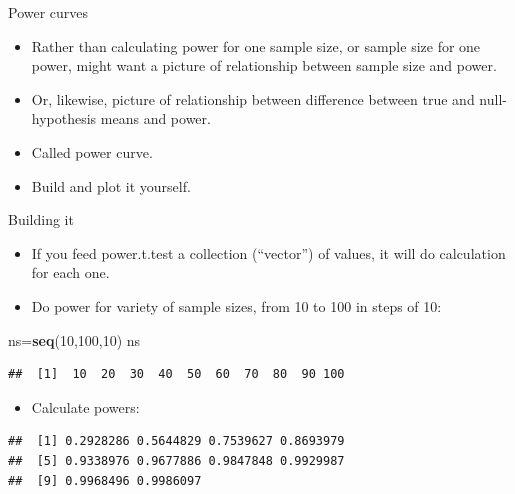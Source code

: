 \documentclass[ignorenonframetext,]{beamer}
\newenvironment{Shaded}{\begin{snugshade}}{\end{snugshade}}
\newcommand{\DataTypeTok}[1]{\textcolor[rgb]{0.13,0.29,0.53}{#1}}
\newcommand{\DecValTok}[1]{\textcolor[rgb]{0.00,0.00,0.81}{#1}}
\newcommand{\KeywordTok}[1]{\textcolor[rgb]{0.13,0.29,0.53}{\textbf{#1}}}
\newcommand{\NormalTok}[1]{#1}
\newcommand{\OperatorTok}[1]{\textcolor[rgb]{0.81,0.36,0.00}{\textbf{#1}}}
\newcommand{\StringTok}[1]{\textcolor[rgb]{0.31,0.60,0.02}{#1}}
\providecommand{\tightlist}{%
  \setlength{\itemsep}{0pt}\setlength{\parskip}{0pt}}
\begin{document}
\begin{frame}{Power curves}
\protect\hypertarget{power-curves}{}

\begin{itemize}
\tightlist
\item
  Rather than calculating power for one sample size, or sample size for
  one power, might want a picture of relationship between sample size
  and power.
\item
  Or, likewise, picture of relationship between difference between true
  and null-hypothesis means and power.
\item
  Called power curve.
\item
  Build and plot it yourself.
\end{itemize}

\end{frame}

\begin{frame}[fragile]{Building it}
\protect\hypertarget{building-it}{}

\begin{itemize}
\tightlist
\item
  If you feed power.t.test a collection (``vector'') of values, it will
  do calculation for each one.
\item
  Do power for variety of sample sizes, from 10 to 100 in steps of 10:
\end{itemize}

\begin{Shaded}
\begin{Highlighting}[]
\NormalTok{ns=}\KeywordTok{seq}\NormalTok{(}\DecValTok{10}\NormalTok{,}\DecValTok{100}\NormalTok{,}\DecValTok{10}\NormalTok{)}
\NormalTok{ns}
\end{Highlighting}
\end{Shaded}

\begin{verbatim}
##  [1]  10  20  30  40  50  60  70  80  90 100
\end{verbatim}

\begin{itemize}
\tightlist
\item
  Calculate powers:
\end{itemize}

\begin{Shaded}
\end{Shaded}

\begin{verbatim}
##  [1] 0.2928286 0.5644829 0.7539627 0.8693979
##  [5] 0.9338976 0.9677886 0.9847848 0.9929987
##  [9] 0.9968496 0.9986097
\end{verbatim}

\end{frame}
\end{document}
